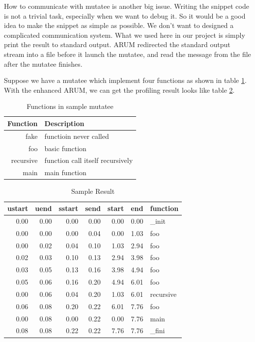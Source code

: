 \documentclass[11pt,letterpaper,oneside]{article}
\begin{document}
How to communicate with mutatee is another big issue. Writing the snippet code is not a trivial task, especially when we want to debug it. So it would be a good idea to make the snippet as simple as possible. We don't want to designed a complicated communication system. What we used here in our project is simply print the result to standard output. ARUM redirected the standard output stream into a file before it launch the mutatee, and read the message from the file after the mutatee finishes.

Suppose we have a mutatee which implement four functions as shown in table \ref{tab:mutatee}. With the enhanced ARUM, we can get the profiling result looks like table \ref{tab:sampleresult}.

\begin{table}[th]
\caption{Functions in sample mutatee}
\centering
\begin{tabular}{rl}
\hline
Function & Description \\
\hline
fake & functioin never called \\
foo  & basic function \\
recursive & function call itself recursively \\
main & main function \\
\hline
\end{tabular}
\label{tab:mutatee}
\end{table}

\begin{table}[th]
\caption{Sample Result}
\centering
\begin{tabular}{rrrrrrl}
\hline
ustart & uend & sstart & send & start & end & function \\
\hline
0.00 & 0.00 & 0.00 & 0.00 & 0.00 & 0.00 & \_init \\
0.00 & 0.00 & 0.00 & 0.04 & 0.00 & 1.03 & foo \\
0.00 & 0.02 & 0.04 & 0.10 & 1.03 & 2.94 & foo \\
0.02 & 0.03 & 0.10 & 0.13 & 2.94 & 3.98 & foo \\
0.03 & 0.05 & 0.13 & 0.16 & 3.98 & 4.94 & foo \\
0.05 & 0.06 & 0.16 & 0.20 & 4.94 & 6.01 & foo \\
0.00 & 0.06 & 0.04 & 0.20 & 1.03 & 6.01 & recursive \\
0.06 & 0.08 & 0.20 & 0.22 & 6.01 & 7.76 & foo \\
0.00 & 0.08 & 0.00 & 0.22 & 0.00 & 7.76 & main \\
0.08 & 0.08 & 0.22 & 0.22 & 7.76 & 7.76 & \_fini \\
\hline
\end{tabular}
\label{tab:sampleresult}
\end{table}
\end{document}
